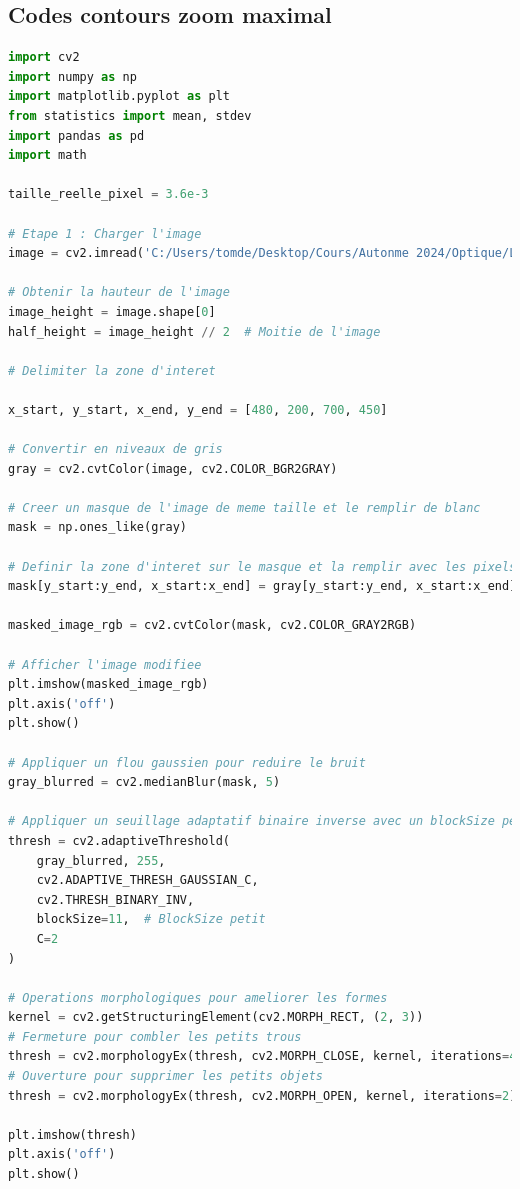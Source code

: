 \documentclass[11pt,letterpaper]{article}
\begin{document}
\subsection{Codes contours zoom maximal}

\begin{lstlisting}[language=python]
import cv2
import numpy as np
import matplotlib.pyplot as plt
from statistics import mean, stdev
import pandas as pd
import math

taille_reelle_pixel = 3.6e-3

# Etape 1 : Charger l'image
image = cv2.imread('C:/Users/tomde/Desktop/Cours/Autonme 2024/Optique/Laboratoire 2/Res/res_1m_max.png')

# Obtenir la hauteur de l'image
image_height = image.shape[0]
half_height = image_height // 2  # Moitie de l'image

# Delimiter la zone d'interet 

x_start, y_start, x_end, y_end = [480, 200, 700, 450]

# Convertir en niveaux de gris
gray = cv2.cvtColor(image, cv2.COLOR_BGR2GRAY)

# Creer un masque de l'image de meme taille et le remplir de blanc
mask = np.ones_like(gray)  

# Definir la zone d'interet sur le masque et la remplir avec les pixels d'origine
mask[y_start:y_end, x_start:x_end] = gray[y_start:y_end, x_start:x_end]

masked_image_rgb = cv2.cvtColor(mask, cv2.COLOR_GRAY2RGB)

# Afficher l'image modifiee
plt.imshow(masked_image_rgb)
plt.axis('off')
plt.show()

# Appliquer un flou gaussien pour reduire le bruit
gray_blurred = cv2.medianBlur(mask, 5)

# Appliquer un seuillage adaptatif binaire inverse avec un blockSize petit
thresh = cv2.adaptiveThreshold(
    gray_blurred, 255,
    cv2.ADAPTIVE_THRESH_GAUSSIAN_C,
    cv2.THRESH_BINARY_INV,
    blockSize=11,  # BlockSize petit
    C=2
)

# Operations morphologiques pour ameliorer les formes
kernel = cv2.getStructuringElement(cv2.MORPH_RECT, (2, 3))
# Fermeture pour combler les petits trous
thresh = cv2.morphologyEx(thresh, cv2.MORPH_CLOSE, kernel, iterations=4)
# Ouverture pour supprimer les petits objets
thresh = cv2.morphologyEx(thresh, cv2.MORPH_OPEN, kernel, iterations=2)

plt.imshow(thresh)
plt.axis('off')
plt.show()


\end{lstlisting}
\end{document}
